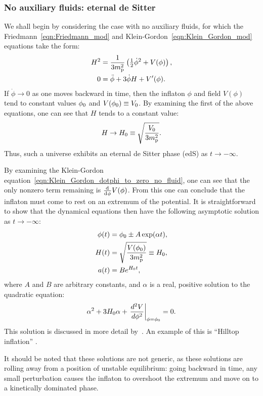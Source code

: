 \subsubsection{No auxiliary fluids: eternal de Sitter}
We shall begin by considering the case with no auxiliary fluids, for which the Friedmann~\eqref{eqn:Friedmann_mod} and Klein-Gordon~\eqref{eqn:Klein_Gordon_mod} equations take the form:
\begin{align}
  H^2 
  &=
  \frac{1}{3m_{\mathrm{p}}^2}\left({\textstyle\frac{1}{2}}\dot{\phi}^2 + V(\phi) \right),
  \label{eqn:Friedmann_dotphi_to_zero_no_fluid} 
  \\
  0
  &=
  \ddot{\phi} +3\dot{\phi}H + V^\prime(\phi).
  \label{eqn:Klein_Gordon_dotphi_to_zero_no_fluid}
\end{align}
If \(\dot{\phi}\to 0\) as one moves backward in time, then the inflaton \(\phi\) and field \(V(\phi)\) tend to constant values \(\phi_0\) and \(V(\phi_0)\equiv V_0\). By examining the first of the above equations, one can see that \(H\) tends to a constant value:
\begin{equation}
  H\to H_0 \equiv \sqrt{\frac{V_0}{3m_{\mathrm{p}}^2}}.
\end{equation}
Thus, such a universe exhibits an eternal de Sitter phase (edS) as \(t\to-\infty\).

By examining the Klein-Gordon equation~\eqref{eqn:Klein_Gordon_dotphi_to_zero_no_fluid}, one can see that the only nonzero term remaining is \(\frac{\operatorname{d}^{}\!{}}{\operatorname{d}^{}\!{\phi}}V(\phi)\). From this one can conclude that the inflaton must come to rest on an extremum of the potential. It is straightforward to show that the dynamical equations then have the following asymptotic solution as \(t \to -\infty\):
\begin{align}
  \phi(t)
  &=
  \phi_0 \pm A \exp(\alpha t),\\
  H(t)
  &=
  \sqrt{\frac{V(\phi_0)}{3m_{\mathrm{p}}^2}} \equiv H_0,\\
  a(t)
  &=
  B e^{H_0t},
\end{align}
where \(A\) and \(B\)  are arbitrary constants, and \(\alpha\) is a real, positive solution to the quadratic equation:
% 
\begin{equation}
  \alpha^2 + 3H_0\alpha + \left.
  \frac{{d^2}V}{{d}\phi^2}\right|_{\phi=\phi_0}=0.
\end{equation}
This solution is discussed in more detail by~\cite{destri_preinflationary_2010}. An example of this is ``Hilltop inflation'' \citep{linde_1982,albrecht_1982}. 

It should be noted that these solutions are not generic, as these solutions are rolling away from a position of unstable equilibrium: going backward in time, any small perturbation causes the inflaton to overshoot the extremum and move on to a kinetically dominated phase.

